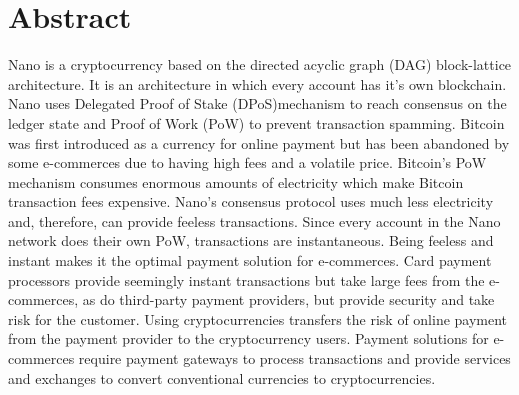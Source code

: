 \documentclass{ferseminar}
\begin{document}
\section{Abstract}
Nano is a cryptocurrency based on the directed acyclic graph (DAG) block-lattice architecture. It is an architecture in which every account has it's own blockchain. Nano uses Delegated Proof of Stake (DPoS)mechanism to reach consensus on the ledger state and Proof of Work (PoW) to prevent transaction spamming. Bitcoin was first introduced as a currency for online payment but has been abandoned by some e-commerces due to having high fees and a volatile price. Bitcoin's PoW mechanism consumes enormous amounts of electricity which make Bitcoin transaction fees expensive. Nano's consensus protocol uses much less electricity and, therefore, can provide feeless transactions. Since every account in the Nano network does their own PoW, transactions are instantaneous. Being feeless and instant makes it the optimal payment solution for e-commerces. Card payment processors provide seemingly instant transactions but take large fees from the e-commerces, as do third-party payment providers, but provide security and take risk for the customer. Using cryptocurrencies transfers the risk of online payment from the payment provider to the cryptocurrency users. Payment solutions for e-commerces require payment gateways to process transactions and provide services and exchanges to convert conventional currencies to cryptocurrencies.  
\end{document}
